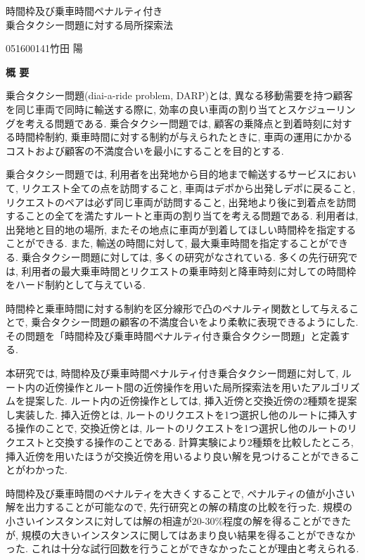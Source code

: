 \begin{center}
{\LARGE 時間枠及び乗車時間ペナルティ付き\\乗合タクシー問題に対する局所探索法}\\[0.5cm]
\end{center}
\hfill
{\large 051600141\qquad 竹田 陽}\\[0.5cm]
\begin{center}
{\Large \bf 概 要}\\
\end{center}


乗合タクシー問題(diai-a-ride problem, DARP)とは, 異なる移動需要を持つ顧客を同じ車両で同時に輸送する際に, 効率の良い車両の割り当てとスケジューリングを考える問題である. 乗合タクシー問題では, 顧客の乗降点と到着時刻に対する時間枠制約, 乗車時間に対する制約が与えられたときに, 車両の運用にかかるコストおよび顧客の不満度合いを最小にすることを目的とする.

乗合タクシー問題では, 利用者を出発地から目的地まで輸送するサービスにおいて, リクエスト全ての点を訪問すること, 車両はデポから出発しデポに戻ること, リクエストのペアは必ず同じ車両が訪問すること, 出発地より後に到着点を訪問することの全てを満たすルートと車両の割り当てを考える問題である. 利用者は, 出発地と目的地の場所, またその地点に車両が到着してほしい時間枠を指定することができる.
また, 輸送の時間に対して, 最大乗車時間を指定することができる.
乗合タクシー問題に対しては, 多くの研究がなされている. 多くの先行研究では, 利用者の最大乗車時間とリクエストの乗車時刻と降車時刻に対しての時間枠をハード制約として与えている.

時間枠と乗車時間に対する制約を区分線形で凸のペナルティ関数として与えることで, 乗合タクシー問題の顧客の不満度合いをより柔軟に表現できるようにした. その問題を「時間枠及び乗車時間ペナルティ付き乗合タクシー問題」と定義する.

本研究では, 時間枠及び乗車時間ペナルティ付き乗合タクシー問題に対して, ルート内の近傍操作とルート間の近傍操作を用いた局所探索法を用いたアルゴリズムを提案した.
ルート内の近傍操作としては, 挿入近傍と交換近傍の2種類を提案し実装した.
挿入近傍とは, ルートのリクエストを1つ選択し他のルートに挿入する操作のことで, 交換近傍とは, ルートのリクエストを1つ選択し他のルートのリクエストと交換する操作のことである.
計算実験により2種類を比較したところ, 挿入近傍を用いたほうが交換近傍を用いるより良い解を見つけることができることがわかった.

時間枠及び乗車時間のペナルティを大きくすることで, ペナルティの値が小さい解を出力することが可能なので, 先行研究との解の精度の比較を行った. 規模の小さいインスタンスに対しては解の相違が20-30\%程度の解を得ることができたが, 規模の大きいインスタンスに関してはあまり良い結果を得ることができなかった. これは十分な試行回数を行うことができなかったことが理由と考えられる.


